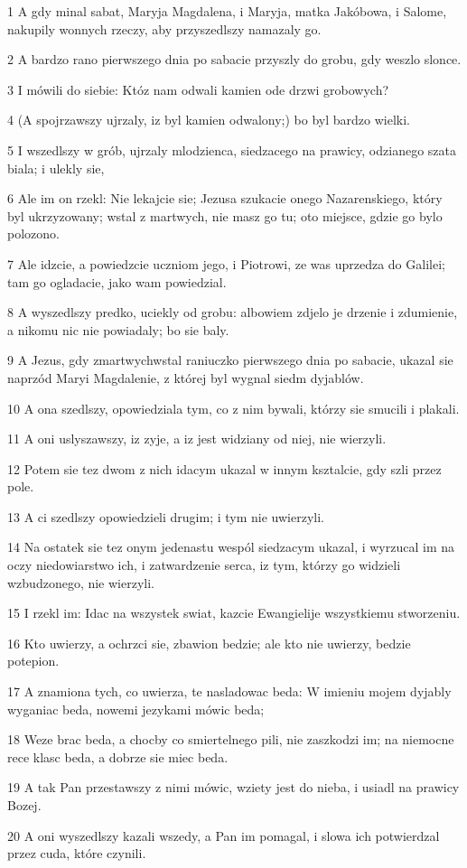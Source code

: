 \par 1 A gdy minal sabat, Maryja Magdalena, i Maryja, matka Jakóbowa, i Salome, nakupily wonnych rzeczy, aby przyszedlszy namazaly go.
\par 2 A bardzo rano pierwszego dnia po sabacie przyszly do grobu, gdy weszlo slonce.
\par 3 I mówili do siebie: Któz nam odwali kamien ode drzwi grobowych?
\par 4 (A spojrzawszy ujrzaly, iz byl kamien odwalony;) bo byl bardzo wielki.
\par 5 I wszedlszy w grób, ujrzaly mlodzienca, siedzacego na prawicy, odzianego szata biala; i ulekly sie,
\par 6 Ale im on rzekl: Nie lekajcie sie; Jezusa szukacie onego Nazarenskiego, który byl ukrzyzowany; wstal z martwych, nie masz go tu; oto miejsce, gdzie go bylo polozono.
\par 7 Ale idzcie, a powiedzcie uczniom jego, i Piotrowi, ze was uprzedza do Galilei; tam go ogladacie, jako wam powiedzial.
\par 8 A wyszedlszy predko, uciekly od grobu: albowiem zdjelo je drzenie i zdumienie, a nikomu nic nie powiadaly; bo sie baly.
\par 9 A Jezus, gdy zmartwychwstal raniuczko pierwszego dnia po sabacie, ukazal sie naprzód Maryi Magdalenie, z której byl wygnal siedm dyjablów.
\par 10 A ona szedlszy, opowiedziala tym, co z nim bywali, którzy sie smucili i plakali.
\par 11 A oni uslyszawszy, iz zyje, a iz jest widziany od niej, nie wierzyli.
\par 12 Potem sie tez dwom z nich idacym ukazal w innym ksztalcie, gdy szli przez pole.
\par 13 A ci szedlszy opowiedzieli drugim; i tym nie uwierzyli.
\par 14 Na ostatek sie tez onym jedenastu wespól siedzacym ukazal, i wyrzucal im na oczy niedowiarstwo ich, i zatwardzenie serca, iz tym, którzy go widzieli wzbudzonego, nie wierzyli.
\par 15 I rzekl im: Idac na wszystek swiat, kazcie Ewangielije wszystkiemu stworzeniu.
\par 16 Kto uwierzy, a ochrzci sie, zbawion bedzie; ale kto nie uwierzy, bedzie potepion.
\par 17 A znamiona tych, co uwierza, te nasladowac beda: W imieniu mojem dyjably wyganiac beda, nowemi jezykami mówic beda;
\par 18 Weze brac beda, a chocby co smiertelnego pili, nie zaszkodzi im; na niemocne rece klasc beda, a dobrze sie miec beda.
\par 19 A tak Pan przestawszy z nimi mówic, wziety jest do nieba, i usiadl na prawicy Bozej.
\par 20 A oni wyszedlszy kazali wszedy, a Pan im pomagal, i slowa ich potwierdzal przez cuda, które czynili.


